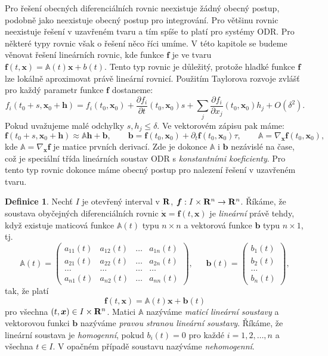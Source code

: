 \documentclass[a4paper, 12pt]{book}
\theoremstyle{definition}
\newtheorem{definition}[theorem]{Definice}
\def\grad{\nabla}
\def\to{\rightarrow}
\def\Real{{\rm\bf R}}
\def\vc#1{\mathbf{\boldsymbol{#1}}}     %
\def\tn#1{{\mathbb{#1}}}    %
\def\prtl{\partial}                                        %
\def\df#1{\emph{#1}}
\begin{document}

Pro řešení obecných diferenciálních rovnic neexistuje žádný obecný postup, podobně jako neexistuje obecný postup pro integrování. Pro většinu rovnic neexistuje
řešení v uzavřeném tvaru a tím spíše to platí pro systémy ODR. Pro některé typy rovnic však o řešení něco říci umíme. V této kapitole se budeme věnovat řešení lineárních rovnic, kde
funkce $\vc f$ je ve tvaru $\vc f(t,\vc x) = \tn A(t) \vc x + b(t)$. Tento typ rovnic je důležitý, protože hladké funkce $\vc f$ lze lokálně aproximovat právě lineární rovnicí.
Použitím Taylorova rozvoje zvlášť pro každý parametr funkce $\vc f$ dostaneme:
\[
   f_i(t_0 + s, \vc x_0 + \vc h) = f_i(t_0, \vc x_0) + \frac{\prtl f_i}{\prtl t}(t_0,\vc x_0)s + \sum_j \frac{\prtl f_i}{\prtl x_j}(t_0,\vc x_0) h_j + O(\delta^2).
\]
Pokud uvažujeme malé odchylky $s, h_j \le \delta$. Ve vektorovém zápisu pak máme:
\[
  \vc f(t_0 + s, \vc x_0 + \vc h) \approx \tn A \vc h + \vc b,\qquad \vc b=\vc f(t_0, \vc x_0) + \prtl_{t} \vc f(t_0, \vc x_0) \tau,\qquad \tn A = \grad_{\vc x} \vc f(t_0, \vc x_0),
\]
kde $\tn A =\grad_{\vc x} \vc f$ je matice prvních derivací. Zde je dokonce $\tn A$ i $\vc b$ nezávislé na čase, což je speciální třída lineárních soustav ODR s \df{konstantními koeficienty}.
Pro tento typ rovnic dokonce máme obecný postup pro nalezení řešení v uzavřeném tvaru.



\begin{definition}
Nechť $I$ je otevřený interval v $\Real$, $\vc f: I\times \Real^n \to \Real^n$.
Říkáme, že soustava obyčejných diferenciálních rovnic 
$\dot{\vc x}=\vc f(t,\vc x)$ je \df{lineární} právě tehdy, když existuje maticová 
funkce $\tn A(t)$ typu $n\times n$ a vektorová funkce $\vc b$ typu $n\times 1$, tj.
\begin{equation}
{\tn A}(t) = \left(\begin{array}{rrrr}
a_{11}(t)&a_{12}(t)&\dots&a_{1n}(t)\\
a_{21}(t)&a_{22}(t)&\dots&a_{2n}(t)\\
\dots&\dots&\dots&\dots\\
a_{n1}(t)&a_{n2}(t)&\dots&a_{nn}(t)
\end{array}\right), ~~~~~~~
{\vc b}(t) = \left(\begin{array}{c}
b_1(t)\\ b_2(t)\\ \dots\\ b_n(t)
\end{array}\right),
\end{equation}
tak, že platí 
\begin{equation}
\vc f(t, \vc x)={\tn A}(t)\vc x+{\vc b}(t)
\end{equation}
pro všechna $(t,\vc x)\in I\times \Real^n$.
Matici $\tn A$ nazýváme \emph{maticí lineární soustavy} a vektorovou funkci 
$\vc b$ nazýváme \emph{pravou stranou lineární soustavy}. Říkáme, že lineární 
soustava je \emph{homogenní}, pokud $b_i(t)=0$ pro každé $i=1,2,\dots,n$ a 
všechna $t\in I$. V opačném případě soustavu nazýváme \emph{nehomogenní}.
\end{definition}
\end{document}
